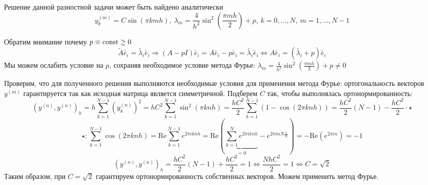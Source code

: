 \begin{example}
  Решение данной разностной задачи может быть найдено аналитически
  \[y_{k}^{(m)}=C\sin(\pi kmh),\ \lambda_m = \frac{4}{h^2}\sin^2\left(\frac{\pi m h}{2}\right)+p,\ k=0,\ldots,N,\ m=1,\ldots,N-1\]

  \begin{remark}
    Обратим внимание почему $p\equiv\mathrm{const}\geq0$
    \[\tilde{A}\tilde{e_i}=\tilde{\lambda_i}\tilde{e_i}\Rightarrow(A-pI)\tilde{e_i}=A\tilde{e_i}-p\tilde{e_i}=\tilde{\lambda_i}\tilde{e_i}\Leftrightarrow A\tilde{e_i}=(\tilde{\lambda_i}+p)\tilde{e_i}\]
    Мы можем ослабить условие на $p$, сохраняя необходимое условие метода Фурье:
    $\lambda_m=\frac{4}{h^2}\sin^2\left(\frac{\pi m h}{2}\right)+p\neq0$
  \end{remark}

  Проверим, что для полученного решения выполняются необходимые условия
  для применения метода Фурье: ортогональность векторов $y^{(m)}$
  гарантируется так как исходная матрица является симметричной.
  Подберем $C$ так, чтобы выполнялась ортонормированность:
  \[(y^{(n)},y^{(n)})_h=h\sum_{k=1}^{N-1}(y^{(n)}_k)^2=hC^2\sum_{k=1}^{N-1}\sin^2(\pi knh)=\frac{hC^2}{2}\sum_{k=1}^{N-1}(1-\cos(2\pi knh))=\frac{hC^2}{2}(N-1)-\frac{hC^2}{2}\cdot\star\]
  \[\star: \sum_{k=1}^{N-1}\cos(2\pi knh)=\text{Re}\sum_{k=1}^{N-1}e^{2\pi iknh}=\text{Re}\left(\underbrace{\sum_{k=1}^{N}e^{2\pi iknh}}_{=0}-e^{2\pi inN\frac{1}{N}}\right)=-\text{Re}(e^{2\pi in})=-1\]
  \[(y^{(n)},y^{(n)})_h=\frac{hC^2}{2}(N-1)+\frac{hC^2}{2}=1\Leftrightarrow\frac{NhC^2}{2}=1\Leftrightarrow C=\sqrt{2}\]
  Таким образом, при $C=\sqrt{2}$ гарантируем ортонормированность собственных векторов. Можем применить метод Фурье.
\end{example}

